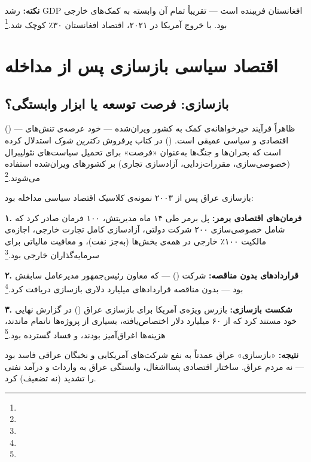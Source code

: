 \textbf{نکته:} رشد GDP افغانستان فریبنده است — تقریباً تمام آن وابسته به کمک‌های خارجی بود. با خروج آمریکا در ۲۰۲۱، اقتصاد افغانستان ۳۰٪ کوچک شد.\footnote{}


\section{اقتصاد سیاسی بازسازی پس از مداخله}
\label{sec:ch12-reconstruction}

\subsection{بازسازی: فرصت توسعه یا ابزار وابستگی؟}
\label{subsec:ch12-reconstruction-politics}

 () — ظاهراً فرآیند خیرخواهانه‌ی کمک به کشور ویران‌شده — خود عرصه‌ی تنش‌های اقتصادی و سیاسی عمیقی است.  () در کتاب پرفروش \textit{دکترین شوک} استدلال کرده است که بحران‌ها و جنگ‌ها به‌عنوان «فرصت» برای تحمیل سیاست‌های نئولیبرال (خصوصی‌سازی، مقررات‌زدایی، آزادسازی تجاری) بر کشورهای ویران‌شده استفاده می‌شوند.\footnote{}

\begin{tcolorbox}[casebox, title={مطالعه‌ی موردی: بازسازی عراق و «سرمایه‌داری بحران»}]
بازسازی عراق پس از ۲۰۰۳ نمونه‌ی کلاسیک اقتصاد سیاسی مداخله بود:

\textbf{۱. فرمان‌های اقتصادی برمر:}
پل برمر طی ۱۴ ماه مدیریتش، ۱۰۰ فرمان صادر کرد که شامل خصوصی‌سازی ۲۰۰ شرکت دولتی، آزادسازی کامل تجارت خارجی، اجازه‌ی مالکیت ۱۰۰٪ خارجی در همه‌ی بخش‌ها (به‌جز نفت)، و معافیت مالیاتی برای سرمایه‌گذاران خارجی بود.\footnote{}

\textbf{۲. قراردادهای بدون مناقصه:}
شرکت  () — که معاون رئیس‌جمهور  مدیرعامل سابقش بود — بدون مناقصه قراردادهای میلیارد دلاری بازسازی دریافت کرد.\footnote{}

\textbf{۳. شکست بازسازی:}
بازرس ویژه‌ی آمریکا برای بازسازی عراق () در گزارش نهایی خود مستند کرد که از ۶۰ میلیارد دلار اختصاص‌یافته، بسیاری از پروژه‌ها ناتمام ماندند، هزینه‌ها اغراق‌آمیز بودند، و فساد گسترده بود.\footnote{}

\textbf{نتیجه:} «بازسازی» عراق عمدتاً به نفع شرکت‌های آمریکایی و نخبگان عراقی فاسد بود — نه مردم عراق. ساختار اقتصادی پسااشغال، وابستگی عراق به واردات و درآمد نفتی را تشدید (نه تضعیف) کرد.
\end{tcolorbox}

